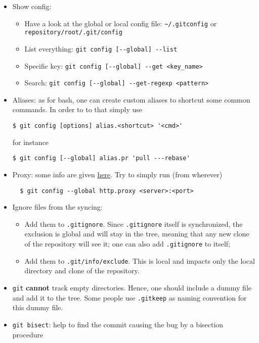 \documentclass[a4paper,12pt,%
              final%
              ]{article}
\begin{document}
\begin{itemize}
  \item Show config:
    \begin{itemize}
      \item Have a look at the global or local config file: \verb|~/.gitconfig| or \verb|repository/root/.git/config|
      \item List everything: \verb|git config [--global] --list|
      \item Specific key: \verb|git config [--global] --get <key_name>|
      \item Search: \verb|git config [--global] --get-regexp <pattern>|
    \end{itemize}
  \item Aliases: as for bash, one can create custom aliases to shortcut some common commands. In order to to that simply use
\begin{verbatim}
$ git config [options] alias.<shortcut> '<cmd>'
\end{verbatim}
        for instance
\begin{verbatim}
$ git config [--global] alias.pr 'pull ---rebase'
\end{verbatim}
  \item Proxy: some info are given \href{https://gist.github.com/evantoli/f8c23a37eb3558ab8765}{here}. Try to simply run (from wherever)
\begin{verbatim}
  $ git config --global http.proxy <server>:<port>
\end{verbatim}
  \item Ignore files from the syncing:
    \begin{itemize}
      \item Add them to \texttt{.gitignore}. Since \texttt{.gitignore} itself is synchronized, the exclusion is global and will stay in the tree, meaning that any new clone of the repository will see it; one can also add \texttt{.gitignore} to itself;
      \item Add them to \texttt{.git/info/exclude}. This is local and impacts only the local directory and clone of the repository.
    \end{itemize}
  \item \texttt{git} \textbf{cannot} track empty directories. Hence, one should include a dummy file and add it to the tree. Some people use \verb|.gitkeep| as naming convention for this dummy file.
  \item \texttt{git bisect}: help to find the commit causing the bug by a bisection procedure
    \begin{itemize}

\end{itemize}
\end{itemize}
\end{document}
